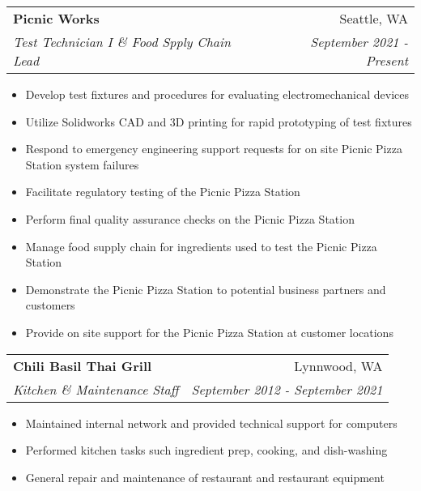 \documentclass[letterpaper,11pt]{article}
\makeatletter
\newcommand{\resumeSubheading}[4]{
  \vspace{-1pt}\item
    \begin{tabular*}{0.97\textwidth}{l@{\extracolsep{\fill}}r}
      \textbf{#1} & #2 \\
      \textit{\small#3} & \textit{\small #4} \\
    \end{tabular*}\vspace{-5pt}
}
\newcommand{\resumeItemListStart}{\begin{itemize}}
\newcommand{\resumeItemListEnd}{\end{itemize}\vspace{-5pt}}
\makeatother
\begin{document}
    \resumeSubheading
    {Picnic Works}{Seattle, WA}
    {Test Technician I \& Food Spply Chain Lead}{September 2021 - Present}
    \resumeItemListStart
      \item{
        Develop test fixtures and procedures for evaluating electromechanical devices
      }
      \item{
        Utilize Solidworks CAD and 3D printing for rapid prototyping of test fixtures
      }
      \item{
        Respond to emergency engineering support requests for on site Picnic Pizza Station system failures
      }
      \item{
        Facilitate regulatory testing of the Picnic Pizza Station
      }
      \item{
        Perform final quality assurance checks on the Picnic Pizza Station
      }
      \item{
        Manage food supply chain for ingredients used to test the Picnic Pizza Station
      }
      \item{
        Demonstrate the Picnic Pizza Station to potential business partners and customers
      }
      \item{
        Provide on site support for the Picnic Pizza Station at customer locations
      }
    \resumeItemListEnd

    \resumeSubheading
      {Chili Basil Thai Grill}{Lynnwood, WA}
      {Kitchen \& Maintenance Staff}{September 2012 - September 2021}
      \resumeItemListStart
        \item{
          Maintained internal network and provided technical support for computers
        }
        \item{
          Performed kitchen tasks such ingredient prep, cooking, and dish-washing
        }
        \item{
          General repair and maintenance of restaurant and restaurant equipment
        }
      \resumeItemListEnd

\end{document}
